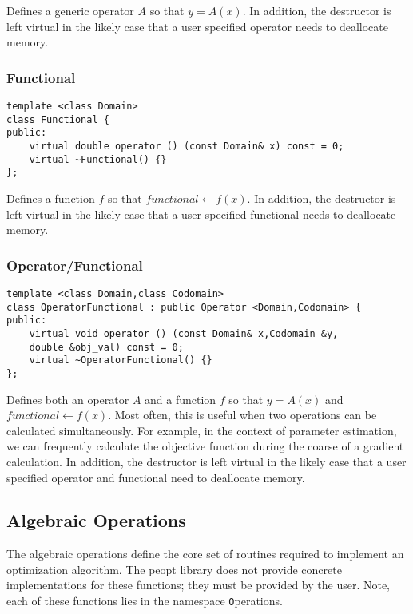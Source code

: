\documentclass{article}
\begin{document}
Defines a generic operator $A$ so that $y=A(x)$.  In addition, the destructor is left virtual in the likely case that a user specified operator needs to deallocate memory.

\subsubsection{Functional}

\begin{flushleft}
\begin{lstlisting}
template <class Domain>
class Functional {
public:
    virtual double operator () (const Domain& x) const = 0;
    virtual ~Functional() {}
};
\end{lstlisting}
\end{flushleft}

Defines a function $f$ so that $functional\leftarrow f(x)$.  In addition, the destructor is left virtual in the likely case that a user specified functional needs to deallocate memory.

\subsubsection{Operator/Functional}

\begin{flushleft}
\begin{lstlisting}
template <class Domain,class Codomain>
class OperatorFunctional : public Operator <Domain,Codomain> {
public:
    virtual void operator () (const Domain& x,Codomain &y,
	double &obj_val) const = 0;
    virtual ~OperatorFunctional() {}
};
\end{lstlisting}
\end{flushleft}

Defines both an operator $A$ and a function $f$ so that $y=A(x)$ and $functional\leftarrow f(x)$.  Most often, this is useful when two operations can be calculated simultaneously.  For example, in the context of parameter estimation, we can frequently calculate the objective function during the coarse of a gradient calculation.  In addition, the destructor is left virtual in the likely case that a user specified operator and functional need to deallocate memory.

\subsection{Algebraic Operations}

	The algebraic operations define the core set of routines required to implement an optimization algorithm.  The peopt library does not provide concrete implementations for these functions; they must be provided by the user.  Note, each of these functions lies in the namespace {\texttt Operations}.
\end{document}
